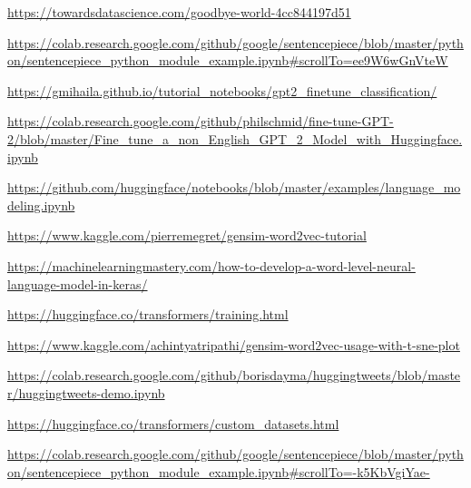 \documentclass[12pt, a4paper]{article}
\begin{document}
\begin{thebibliography}{9}
	\url{https://towardsdatascience.com/goodbye-world-4cc844197d51}
	
	\url{https://colab.research.google.com/github/google/sentencepiece/blob/master/python/sentencepiece_python_module_example.ipynb#scrollTo=ee9W6wGnVteW}
	
	\url{https://gmihaila.github.io/tutorial_notebooks/gpt2_finetune_classification/}
	
	\url{https://colab.research.google.com/github/philschmid/fine-tune-GPT-2/blob/master/Fine_tune_a_non_English_GPT_2_Model_with_Huggingface.ipynb}
	
	\url{https://github.com/huggingface/notebooks/blob/master/examples/language_modeling.ipynb}
	
	\url{https://www.kaggle.com/pierremegret/gensim-word2vec-tutorial}
	
	\url{https://machinelearningmastery.com/how-to-develop-a-word-level-neural-language-model-in-keras/}
	
	\url{https://huggingface.co/transformers/training.html}
	
	\url{https://www.kaggle.com/achintyatripathi/gensim-word2vec-usage-with-t-sne-plot}
	
	\url{https://colab.research.google.com/github/borisdayma/huggingtweets/blob/master/huggingtweets-demo.ipynb}
	
	\url{https://huggingface.co/transformers/custom_datasets.html}
	
	\url{https://colab.research.google.com/github/google/sentencepiece/blob/master/python/sentencepiece_python_module_example.ipynb#scrollTo=-k5KbVgiYae-}
	
\end{thebibliography}
\end{document}
